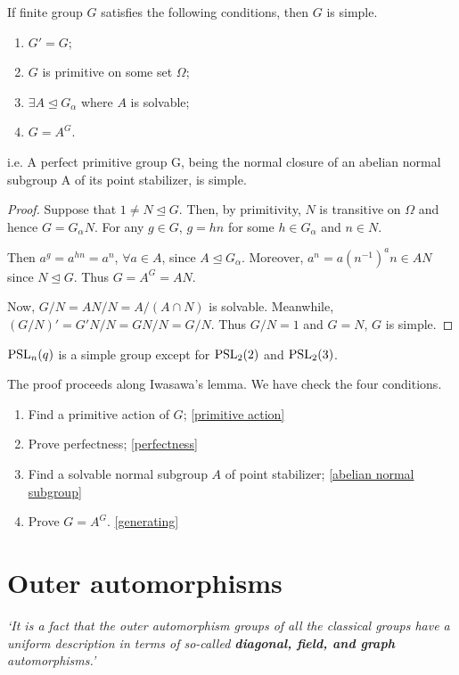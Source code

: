 \documentclass[a4paper,11pt]{article}
\def\subtitle#1{\section{#1}}
\begin{document}
\begin{lemma}[Iwasawa]
    If finite group $G$ satisfies the following conditions, then $G$ is simple.
    \begin{enumerate}[itemsep=0pt,label=\roman*.]
        \item $G'=G$;
        \item $G$ is primitive on some set $\Omega$;
        \item $\exists A\trianglelefteq G_\alpha$ where $A$ is solvable;
        \item $G=A^G$.
    \end{enumerate}
    i.e. A perfect primitive group G, being the normal
    closure of an abelian normal subgroup A of its point stabilizer, is simple.
\end{lemma}
\begin{proof}
    Suppose that $1\neq N\trianglelefteq G$. Then, by primitivity, $N$ is transitive on $\Omega$ and hence $G=G_\alpha N$. For any $g\in G$, $g=hn$ for some $h\in G_\alpha$ and $n\in N$. 
    
    Then $a^g=a^{hn}=a^n$, $\forall a\in A$, since $A\trianglelefteq G_\alpha$. Moreover, $a^n=a(n^{-1})^{a}n\in AN$ since $N\trianglelefteq G$. Thus $G=A^G= AN$.
    
    Now, $G/N=AN/N=A/(A\cap N)$ is solvable. Meanwhile, $(G/N)'=G'N/N=GN/N=G/N$. Thus $G/N=1$ and $G=N$, $G$ is simple.
\end{proof}

\begin{theorem}
    $\mathrm{PSL}_n(q)$ is a simple group except for $\mathrm{PSL}_2(2)$ and $\mathrm{PSL}_2(3)$.
\end{theorem}

The proof proceeds along Iwasawa's lemma. We have check the four conditions.
\begin{enumerate}[itemsep=0pt,label=\roman*.]
    \item Find a primitive action of $G$; \ref{primitive action}
    \item Prove perfectness; \ref{perfectness}
    \item Find a solvable normal subgroup $A$ of point stabilizer; \ref{abelian normal subgroup}
    \item Prove $G=A^G$. \ref{generating}
\end{enumerate}


\subtitle{Outer automorphisms}

\textit{`It is a fact that the outer automorphism groups of all the classical groups have a uniform description in terms of so-called \textbf{diagonal, field, and graph} automorphisms.’}
\end{document}
